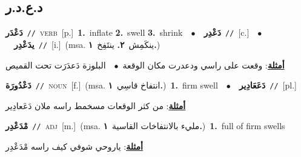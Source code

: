 \documentclass[10pt,a4paper,twoside]{article} %
\begin{document}
\begin{multicols}{2}
\vspace{-3mm}
\subsection*{\color{blue}\foreignlanguage{arabic}{د.ع.د.ر}\color{blue}{}} 

{\setlength\topsep{0pt}\textbf{\foreignlanguage{arabic}{دَعْدَر}}\ {\color{gray}\texttt{//}\color{black}}\ \textsc{verb}\ [p.]\ \textbf{1.}~inflate  \textbf{2.}~swell  \textbf{3.}~shrink\ \ $\bullet$\ \ \setlength\topsep{0pt}\textbf{\foreignlanguage{arabic}{دَعْدِر}}\ {\color{gray}\texttt{//}\color{black}}\ [c.]\ \ $\bullet$\ \ \setlength\topsep{0pt}\textbf{\foreignlanguage{arabic}{يدَعْدِر}}\ {\color{gray}\texttt{//}\color{black}}\ [i.]\ \color{gray}(msa. \foreignlanguage{arabic}{ينكَمِش}~\foreignlanguage{arabic}{\textbf{٢.}}  \foreignlanguage{arabic}{ينتَفِخ}~\foreignlanguage{arabic}{\textbf{١.}})\color{black}\  \begin{flushright}\color{gray}\foreignlanguage{arabic}{\textbf{\underline{\foreignlanguage{arabic}{أمثلة}}}: وقعت على راسي ودعدرت مكان الوقعة\ $\bullet$\ \  البلوزة دَعدَرَت تحت القميص}\end{flushright}\color{black}} \vspace{2mm}

{\setlength\topsep{0pt}\textbf{\foreignlanguage{arabic}{دَعْدُورَة}}\ {\color{gray}\texttt{//}\color{black}}\ \textsc{noun}\ [f.]\ \color{gray}(msa. \foreignlanguage{arabic}{انتفاخ قاسِي}~\foreignlanguage{arabic}{\textbf{١.}})\color{black}\ \textbf{1.}~firm swell\ \ $\bullet$\ \ \setlength\topsep{0pt}\textbf{\foreignlanguage{arabic}{دَعَعَادِير}}\ {\color{gray}\texttt{//}\color{black}}\ [pl.]\  \begin{flushright}\color{gray}\foreignlanguage{arabic}{\textbf{\underline{\foreignlanguage{arabic}{أمثلة}}}: من كثر الوقعات مسخمط راسه ملان دَعَعادِير}\end{flushright}\color{black}} \vspace{2mm}

{\setlength\topsep{0pt}\textbf{\foreignlanguage{arabic}{مْدَعْدِر}}\ {\color{gray}\texttt{//}\color{black}}\ \textsc{adj}\ [m.]\ \color{gray}(msa. \foreignlanguage{arabic}{مليء بالانتفاخات القاسية}~\foreignlanguage{arabic}{\textbf{١.}})\color{black}\ \textbf{1.}~full of firm swells\  \begin{flushright}\color{gray}\foreignlanguage{arabic}{\textbf{\underline{\foreignlanguage{arabic}{أمثلة}}}: ياروحي شوفي كيف راسه مْدَعْدِر}\end{flushright}\color{black}} \vspace{2mm}


\end{multicols}
\end{document}
